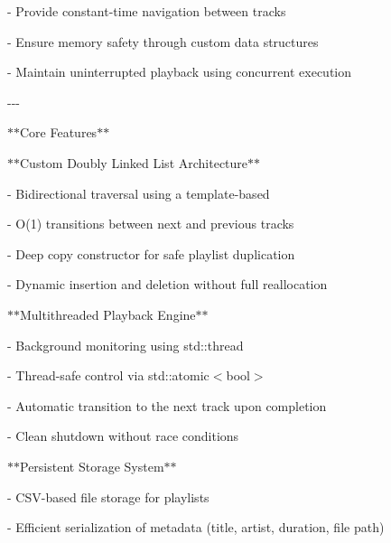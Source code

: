 -\/ Provide constant-\/time navigation between tracks ~\newline


-\/ Ensure memory safety through custom data structures ~\newline


-\/ Maintain uninterrupted playback using concurrent execution ~\newline


-\/-\/-\/

\texorpdfstring{$\ast$}{*}\texorpdfstring{$\ast$}{*}\+Core Features\texorpdfstring{$\ast$}{*}\texorpdfstring{$\ast$}{*}

\texorpdfstring{$\ast$}{*}\texorpdfstring{$\ast$}{*}\+Custom Doubly Linked List Architecture\texorpdfstring{$\ast$}{*}\texorpdfstring{$\ast$}{*}

-\/ Bidirectional traversal using a template-\/based  ~\newline


-\/ O(1) transitions between next and previous tracks ~\newline


-\/ Deep copy constructor for safe playlist duplication ~\newline


-\/ Dynamic insertion and deletion without full reallocation ~\newline


\texorpdfstring{$\ast$}{*}\texorpdfstring{$\ast$}{*}\+Multithreaded Playback Engine\texorpdfstring{$\ast$}{*}\texorpdfstring{$\ast$}{*}

-\/ Background monitoring using std::\+thread ~\newline


-\/ Thread-\/safe control via std::\+atomic$<$bool$>$ ~\newline


-\/ Automatic transition to the next track upon completion ~\newline


-\/ Clean shutdown without race conditions ~\newline


\texorpdfstring{$\ast$}{*}\texorpdfstring{$\ast$}{*}\+Persistent Storage System\texorpdfstring{$\ast$}{*}\texorpdfstring{$\ast$}{*}

-\/ CSV-\/based file storage for playlists ~\newline


-\/ Efficient serialization of metadata (title, artist, duration, file path) ~\newline


